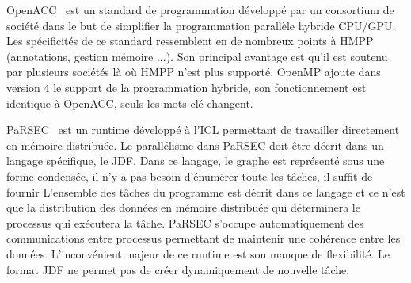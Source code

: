 OpenACC~\cite{OpenACC} est un standard de programmation développé par un consortium de société dans le but de simplifier la programmation parallèle hybride CPU/GPU.
%
Les spécificités de ce standard ressemblent en de nombreux points à HMPP (annotations, gestion mémoire ...).
%
Son principal avantage est qu'il est soutenu par plusieurs sociétés là où HMPP n'est plus supporté.
%
OpenMP ajoute dans version 4 le support de la programmation hybride, son fonctionnement est identique à OpenACC, seuls les mots-clé changent.



PaRSEC~\cite{PaRSEC} est un runtime développé à l'ICL permettant de travailler directement en mémoire distribuée.
%
Le parallélisme dans PaRSEC doit être décrit dans un langage spécifique, le JDF.
%
Dans ce langage, le graphe est représenté sous une forme condensée, il n'y a pas besoin d'énumérer toute les tâches, il suffit de fournir 
%
L'ensemble des tâches du programme est décrit dans ce langage et ce n'est que la distribution des données en mémoire distribuée qui déterminera le processus qui exécutera la tâche.
%
PaRSEC s'occupe automatiquement des communications entre processus permettant de maintenir une cohérence entre les données.
%
L'inconvénient majeur de ce runtime est son manque de flexibilité.
%
Le format JDF ne permet pas de créer dynamiquement de nouvelle tâche.
